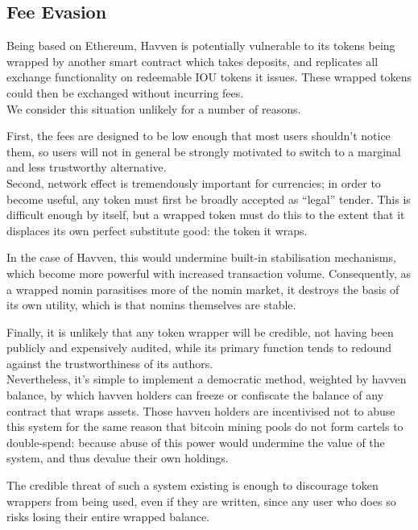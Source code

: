 \newpage

\subsection{Fee Evasion}

\noindent Being based on Ethereum, Havven is potentially vulnerable to its tokens being wrapped by another
smart contract which takes deposits, and replicates all exchange functionality on redeemable IOU tokens
it issues. These wrapped tokens could then be exchanged without incurring fees. \\

\noindent We consider this situation unlikely for a number of reasons.

\noindent First, the fees are designed to be low enough that most users
shouldn't notice them, so users will not in general be strongly motivated to switch
to a marginal and less trustworthy alternative. \\
\noindent Second, network effect is tremendously important for currencies; in order to
become useful, any token must first be broadly accepted as ``legal'' tender. This is difficult
enough by itself, but a wrapped token must do this to the extent that it displaces its own perfect
substitute good: the token it wraps.

\noindent In the case of Havven, this would undermine built-in stabilisation mechanisms,
which become more powerful with increased transaction volume.
Consequently, as a wrapped nomin parasitises more of the nomin market,
it destroys the basis of its own utility, which is that nomins themselves are stable.

\noindent Finally, it is unlikely that any token wrapper will be credible,
not having been publicly and expensively audited, while its primary function
tends to redound against the trustworthiness of its authors. \\

\noindent Nevertheless, it's simple to implement a democratic method, weighted by havven balance,
by which havven holders can freeze or confiscate the balance of any contract that wraps assets.
Those havven holders are incentivised not to abuse this system for the same reason that
bitcoin mining pools do not form cartels to double-spend: because abuse of this power
would undermine the value of the system, and thus devalue their own holdings.

\noindent The credible threat of such a system existing is enough to discourage token wrappers
from being used, even if they are written, since any user who does so risks losing their
entire wrapped balance.

\newpage
